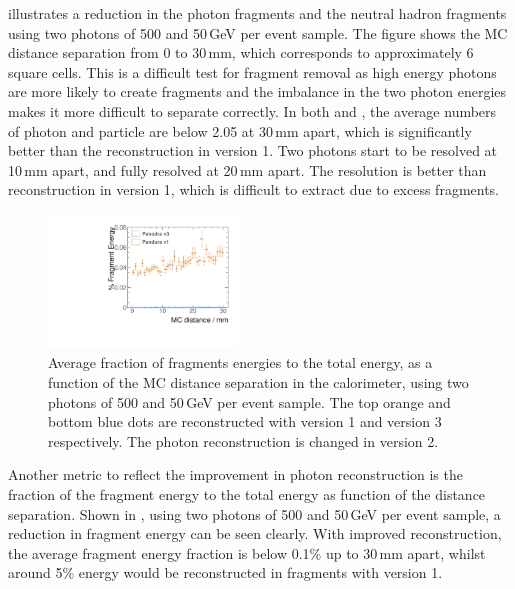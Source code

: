  illustrates a reduction in the photon fragments and the neutral hadron fragments using two photons of 500 and 50\,GeV per event sample. The figure shows the MC distance separation from 0 to 30\,mm, which corresponds to approximately 6 \ECAL square cells. This is a difficult test for fragment removal as high energy photons are more likely to create fragments and the imbalance in the two photon energies makes it more difficult to separate correctly.  In both  and , the average numbers of photon and particle are below 2.05 at 30\,mm apart, which is significantly better than the reconstruction in \pandora version 1. Two photons start to be resolved at 10\,mm apart, and fully resolved at 20\,mm apart. The resolution is better than reconstruction in \pandora version 1, which is difficult to extract due to excess fragments.




\begin{figure}[tbph]
\centering
\includegraphics[width=0.45\textwidth]{photon/DoubleCompareFragEnergy.pdf}
\caption[Average fraction fragments energies of the total energy, as a function of the MC distance separation]
{Average fraction of fragments energies to the total energy, as a function of the MC distance separation in the calorimeter, using two photons of 500 and 50\,GeV per event sample. The top orange and bottom blue dots are reconstructed with \pandora version 1 and version 3 respectively. The photon reconstruction is changed in \pandora version 2.}
\label{fig:photonDoubleFragEnergy}
\end{figure}

Another metric to reflect the improvement in photon reconstruction is the fraction of the fragment energy to the total energy as function of the distance separation. Shown in , using two photons of 500 and 50\,GeV per event sample, a reduction in fragment energy can be seen clearly. With improved reconstruction, the average fragment energy fraction is below 0.1\% up to 30\,mm apart, whilst around 5\% energy would be reconstructed in fragments with \pandora version 1.





